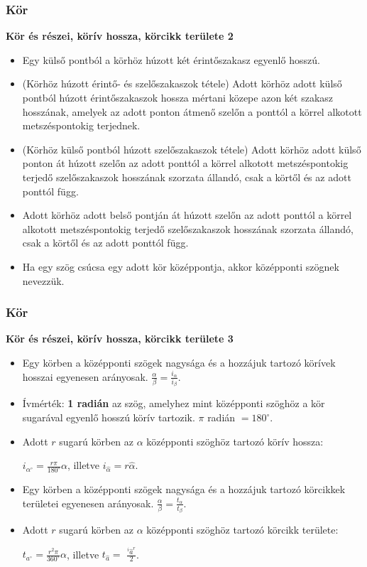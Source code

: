 \documentclass[11pt]{beamer}
\begin{document}
\begin{frame}[<+->]
\frametitle{Kör}
\begin{block}{\textbf{Kör és részei, körív hossza, körcikk területe 2}}
\begin{itemize}[label=$\circ$]
\item Egy külső pontból a körhöz húzott két érintőszakasz egyenlő hosszú.
\item (Körhöz húzott érintő- és szelőszakaszok tétele) Adott körhöz adott külső pontból húzott érintőszakaszok hossza mértani közepe azon két szakasz hosszának, amelyek az adott ponton átmenő szelőn a ponttól a körrel alkotott metszéspontokig terjednek.
\item (Körhöz külső pontból húzott szelőszakaszok tétele) Adott körhöz adott külső ponton át húzott szelőn az adott ponttól a körrel alkotott metszéspontokig terjedő szelőszakaszok hosszának szorzata állandó, csak a körtől és az adott ponttól függ.
\item Adott körhöz adott belső pontján át húzott szelőn az adott ponttól a körrel alkotott metszéspontokig terjedő szelőszakaszok hosszának szorzata állandó, csak a körtől és az adott ponttól függ.
\item Ha egy szög csúcsa egy adott kör középpontja, akkor középponti szögnek nevezzük.
\end{itemize}
\end{block}
\end{frame}

\begin{frame}[<+->]
\frametitle{Kör}
\begin{block}{\textbf{Kör és részei, körív hossza, körcikk területe 3}}
\begin{itemize}[label=$\circ$]
\item Egy körben a középponti szögek nagysága és a hozzájuk tartozó körívek hosszai egyenesen arányosak. $\frac{\alpha}{\beta} = \frac{i_\alpha}{i_\beta}$.
\item Ívmérték: \textbf{1 radián} az szög, amelyhez mint középponti szöghöz a kör sugarával egyenlő hosszú körív tartozik. $\pi$ radián $= 180^\circ$.
\item Adott $r$ sugarú körben az $\alpha$ középponti szöghöz tartozó körív hossza:
\begin{center}
$i_{\alpha^\circ} = \frac{r\pi}{180^\circ}\alpha$, illetve $i_{\hat{\alpha}} = r\hat{\alpha}$.
\end{center}
\item Egy körben a középponti szögek nagysága és a hozzájuk tartozó körcikkek területei egyenesen arányosak. $ \frac{\alpha}{\beta} = \frac{t_\alpha}{t_\beta}$.
\item Adott $r$ sugarú körben az $\alpha$ középponti szöghöz tartozó körcikk területe:
\begin{center}
$t_{a^\circ} = \frac{r^2\pi}{360^\circ}\alpha$, illetve $t_{\hat{a}}=$  $\frac{^i\hat{a}^r}{2}$.
\end{center}
\end{itemize}
\end{block}
\end{frame}
\end{document}
